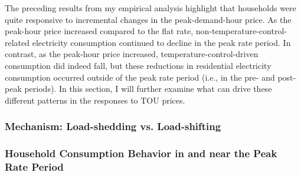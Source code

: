 The preceding results from my empirical analysis highlight that households were quite responsive to incremental changes in the peak-demand-hour price. As the peak-hour price increased compared to the flat rate, non-temperature-control-related electricity consumption continued to decline in the peak rate period. In contrast, as the peak-hour price increased, temperature-control-driven consumption did indeed fall, but these reductions in residential electricity consumption occurred outside of the peak rate period (i.e., in the pre- and post-peak periods). In this section, I will further examine what can drive these different patterns in the responses to TOU prices. 

\subsubsection{Mechanism: Load-shedding vs. Load-shifting}
\label{Sub-subsection:Mechanism}



\subsubsection{Household Consumption Behavior in and near the Peak Rate Period}
\label{Sub-subsection:Household-Consumption-Behavior-in-and-near-the-Peak-Rate-Period}
